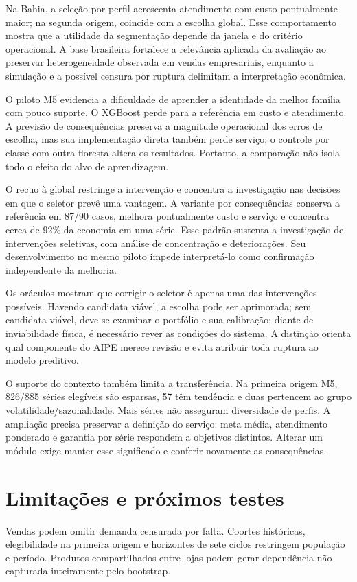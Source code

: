 \documentclass[preprint,12pt]{elsarticle}
\begin{document}
Na Bahia, a seleção por perfil acrescenta atendimento com custo pontualmente maior; na segunda origem, coincide com a escolha global. Esse comportamento mostra que a utilidade da segmentação depende da janela e do critério operacional. A base brasileira fortalece a relevância aplicada da avaliação ao preservar heterogeneidade observada em vendas empresariais, enquanto a simulação e a possível censura por ruptura delimitam a interpretação econômica.

O piloto M5 evidencia a dificuldade de aprender a identidade da melhor família com pouco suporte. O XGBoost perde para a referência em custo e atendimento. A previsão de consequências preserva a magnitude operacional dos erros de escolha, mas sua implementação direta também perde serviço; o controle por classe com outra floresta altera os resultados. Portanto, a comparação não isola todo o efeito do alvo de aprendizagem.

O recuo à global restringe a intervenção e concentra a investigação nas decisões em que o seletor prevê uma vantagem. A variante por consequências conserva a referência em 87/90 casos, melhora pontualmente custo e serviço e concentra cerca de 92\% da economia em uma série. Esse padrão sustenta a investigação de intervenções seletivas, com análise de concentração e deteriorações. Seu desenvolvimento no mesmo piloto impede interpretá-lo como confirmação independente da melhoria.

Os oráculos mostram que corrigir o seletor é apenas uma das intervenções possíveis. Havendo candidata viável, a escolha pode ser aprimorada; sem candidata viável, deve-se examinar o portfólio e sua calibração; diante de inviabilidade física, é necessário rever as condições do sistema. A distinção orienta qual componente do AIPE merece revisão e evita atribuir toda ruptura ao modelo preditivo.

O suporte do contexto também limita a transferência. Na primeira origem M5, 826/885 séries elegíveis são esparsas, 57 têm tendência e duas pertencem ao grupo volatilidade/sazonalidade. Mais séries não asseguram diversidade de perfis. A ampliação precisa preservar a definição do serviço: meta média, atendimento ponderado e garantia por série respondem a objetivos distintos. Alterar um módulo exige manter esse significado e conferir novamente as consequências.

\section{Limitações e próximos testes}
Vendas podem omitir demanda censurada por falta. Coortes históricas, elegibilidade na primeira origem e horizontes de sete ciclos restringem população e período. Produtos compartilhados entre lojas podem gerar dependência não capturada inteiramente pelo bootstrap.
\end{document}
